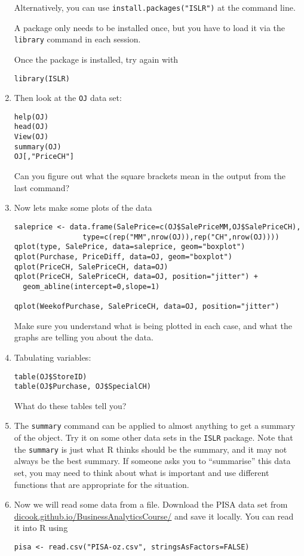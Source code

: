 \documentclass[11pt]{article}
\begin{document}
\begin{enumerate}
Alternatively, you can use \verb|install.packages("ISLR")| at the command line.

A package only needs to be installed once, but you have to load it via the \verb|library| command in each session.

Once the package is installed, try again with 
\begin{verbatim}
library(ISLR)
\end{verbatim}

\item Then look at the \verb|OJ| data set:
\begin{verbatim}
help(OJ)
head(OJ)
View(OJ)
summary(OJ)
OJ[,"PriceCH"]
\end{verbatim}

Can you figure out what the square brackets mean in the output from the last command?

\item Now lets make some plots of the data
\begin{verbatim}
saleprice <- data.frame(SalePrice=c(OJ$SalePriceMM,OJ$SalePriceCH),
                type=c(rep("MM",nrow(OJ)),rep("CH",nrow(OJ))))
qplot(type, SalePrice, data=saleprice, geom="boxplot")
qplot(Purchase, PriceDiff, data=OJ, geom="boxplot")
qplot(PriceCH, SalePriceCH, data=OJ)
qplot(PriceCH, SalePriceCH, data=OJ, position="jitter") + 
  geom_abline(intercept=0,slope=1)

qplot(WeekofPurchase, SalePriceCH, data=OJ, position="jitter")
\end{verbatim}
Make sure you understand what is being plotted in each case, and what the graphs are telling you about the data.

\item Tabulating variables:
\begin{verbatim}
table(OJ$StoreID)
table(OJ$Purchase, OJ$SpecialCH)
\end{verbatim}
What do these tables tell you?


\item The \verb|summary| command can be applied to almost anything to get a summary of the object. Try it on some other data sets in the \verb|ISLR| package. Note that the \verb|summary| is just what R thinks should be the summary, and it may not always be the best summary. If someone asks you to ``summarise'' this data set, you may need to think about what is important and use different functions that are appropriate for the situation.

\item Now we will read some data from a file. Download the PISA data set from \url{dicook.github.io/BusinessAnalyticsCourse/} and save it locally. You can read it into R using
\begin{verbatim}
pisa <- read.csv("PISA-oz.csv", stringsAsFactors=FALSE)
\end{verbatim}


\end{enumerate}
\end{document}
